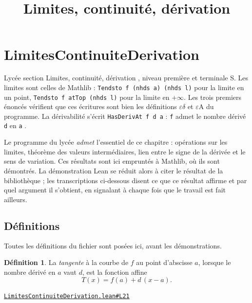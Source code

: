 \documentclass[11pt,a4paper]{article}
\title{Limites, continuité, dérivation}
\date{}
\theoremstyle{definition}
\newtheorem{definition}{Définition}
\theoremstyle{plain}
\newcommand{\source}[2]{\par\smallskip\noindent\hfill{\footnotesize\href{#1}{\texttt{#2}}}\par\smallskip}
\begin{document}
\maketitle
\sloppy

\section{LimitesContinuiteDerivation}

\noindent
Lycée \textemdash{} section \og{} Limites, continuité, dérivation \fg{}, niveau première
et terminale S. Les limites sont celles de Mathlib : \texttt{Tendsto f (nhds a) (nhds l)}
pour la limite en un point, \texttt{Tendsto f atTop (nhds l)} pour la limite en
\(+\infty\). Les trois premiers énoncés vérifient que ces écritures sont bien les
définitions \og{} \(\varepsilon\)\textendash{}\(\delta\) \fg{} et
\og{} \(\varepsilon\)\textendash{}A \fg{} du programme. La dérivabilité s'écrit
\texttt{HasDerivAt f d a} : \og{} \texttt{f} admet le nombre dérivé \texttt{d} en
\texttt{a} \fg{}.

\medskip\noindent
Le programme du lycée \emph{admet} l'essentiel de ce chapitre : opérations sur les
limites, théorème des valeurs intermédiaires, lien entre le signe de la dérivée et le
sens de variation. Ces résultats sont ici empruntés à Mathlib, où ils sont démontrés. La
démonstration Lean se réduit alors à citer le résultat de la bibliothèque ; les
transcriptions ci-dessous disent ce que ce résultat affirme et par quel argument il
s'obtient, en signalant à chaque fois que le travail est fait ailleurs.

\subsection{Définitions}

\noindent
Toutes les définitions du fichier sont posées ici, avant les démonstrations.

\begin{definition}
La \emph{tangente} à la courbe de $f$ au point d'abscisse $a$, lorsque le nombre dérivé
en $a$ vaut $d$, est la fonction affine
\[ T(x) = f(a) + d\,(x - a) . \]
\end{definition}
\source{https://github.com/Commutator-IO/learn-lean/blob/main/cours/02-lycee/04-limites-continuite-derivation/LimitesContinuiteDerivation.lean\#L21}{LimitesContinuiteDerivation.lean\#L21}
\end{document}
